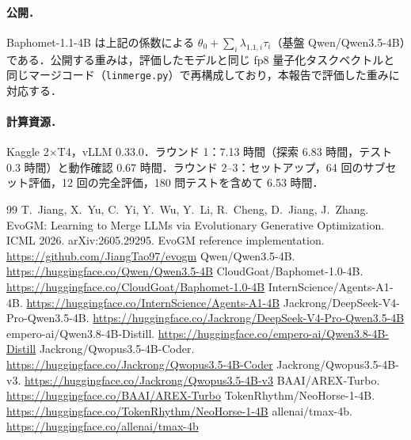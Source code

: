 \documentclass[uplatex,dvipdfmx,10pt,a4paper]{jsarticle}
\begin{document}
\paragraph{公開．}Baphomet-1.1-4B は上記の係数による $\theta_0+\sum_i\lambda_{1.1,i}\tau_i$（基盤 Qwen/Qwen3.5-4B）である．公開する重みは，評価したモデルと同じ fp8 量子化タスクベクトルと同じマージコード（\texttt{linmerge.py}）で再構成しており，本報告で評価した重みに対応する．

\paragraph{計算資源．}Kaggle 2$\times$T4，vLLM 0.33.0．ラウンド 1：7.13 時間（探索 6.83 時間，テスト 0.3 時間）と動作確認 0.67 時間．ラウンド 2--3：セットアップ，64 回のサブセット評価，12 回の完全評価，180 問テストを含めて 6.53 時間．

\renewcommand{\refname}{参考文献}
\small
\begin{thebibliography}{99}
 T.~Jiang, X.~Yu, C.~Yi, Y.~Wu, Y.~Li, R.~Cheng, D.~Jiang, J.~Zhang. EvoGM: Learning to Merge LLMs via Evolutionary Generative Optimization. ICML 2026. arXiv:2605.29295.
 EvoGM reference implementation. \url{https://github.com/JiangTao97/evogm}
 Qwen/Qwen3.5-4B. \url{https://huggingface.co/Qwen/Qwen3.5-4B}
 CloudGoat/Baphomet-1.0-4B. \url{https://huggingface.co/CloudGoat/Baphomet-1.0-4B}
 InternScience/Agents-A1-4B. \url{https://huggingface.co/InternScience/Agents-A1-4B}
 Jackrong/DeepSeek-V4-Pro-Qwen3.5-4B. \url{https://huggingface.co/Jackrong/DeepSeek-V4-Pro-Qwen3.5-4B}
 empero-ai/Qwen3.8-4B-Distill. \url{https://huggingface.co/empero-ai/Qwen3.8-4B-Distill}
 Jackrong/Qwopus3.5-4B-Coder. \url{https://huggingface.co/Jackrong/Qwopus3.5-4B-Coder}
 Jackrong/Qwopus3.5-4B-v3. \url{https://huggingface.co/Jackrong/Qwopus3.5-4B-v3}
 BAAI/AREX-Turbo. \url{https://huggingface.co/BAAI/AREX-Turbo}
 TokenRhythm/NeoHorse-1-4B. \url{https://huggingface.co/TokenRhythm/NeoHorse-1-4B}
 allenai/tmax-4b. \url{https://huggingface.co/allenai/tmax-4b}
\end{thebibliography}
\end{document}
